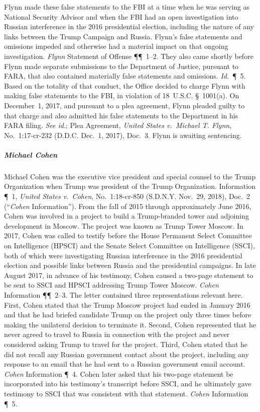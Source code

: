 Flynn made these false statements to the FBI at a time when he was serving as National Security Advisor and when the FBI had an open investigation into Russian interference in the 2016 presidential election, including the nature of any links between the Trump Campaign and Russia.
Flynn's false statements and omissions impeded and otherwise had a material impact on that ongoing investigation.
\textit{Flynn} Statement of Offense \P\P~1--2.
They also came shortly before Flynn made separate submissions to the Department of Justice, pursuant to FARA, that also contained materially false statements and omissions.
\textit{Id}.~\P~5.
Based on the totality of that conduct, the Office decided to charge Flynn with making false statements to the FBI, in violation of 18~U.S.C. \S~1001(a).
On December~1, 2017, and pursuant to a plea agreement, Flynn pleaded guilty to that charge and also admitted his false statements to the Department in his FARA filing.
\textit{See id}.; Plea Agreement, \textit{United States v.\ Michael T. Flynn}, No.~1:17-cr-232 (D.D.C. Dec.~1, 2017), Doc.~3.
Flynn is awaiting sentencing.

\subparagraph{Michael Cohen}
Michael Cohen was the executive vice president and special counsel to the Trump Organization when Trump was president of the Trump Organization.
Information \P~1, \textit{United States v.\ Cohen}, No.~1:18-cr-850 (S.D.N.Y. Nov.~29, 2018), Doc.~2 (``\textit{Cohen} Information'').
From the fall of 2015 through approximately June 2016, Cohen was involved in a project to build a Trump-branded tower and adjoining development in Moscow.
The project was known as Trump Tower Moscow.
In 2017, Cohen was called to testify before the House Permanent Select Committee on Intelligence (HPSCI) and the Senate Select Committee on Intelligence (SSCI), both of which were investigating Russian interference in the 2016 presidential election and possible links between Russia and the presidential campaigns.
In late August 2017, in advance of his testimony, Cohen caused a two-page statement to be sent to SSCI and HPSCI addressing Trump Tower Moscow.
\textit{Cohen} Information \P\P~2--3.
The letter contained three representations relevant here.
First, Cohen stated that the Trump Moscow project had ended in January 2016 and that he had briefed candidate Trump on the project only three times before making the unilateral decision to terminate it.
Second, Cohen represented that he never agreed to travel to Russia in connection with the project and never considered asking Trump to travel for the project.
Third, Cohen stated that he did not recall any Russian government contact about the project, including any response to an email that he had sent to a Russian government email account.
\textit{Cohen} Information \P~4.
Cohen later asked that his two-page statement be incorporated into his testimony's transcript before SSCI, and he ultimately gave testimony to SSCI that was consistent with that statement.
\textit{Cohen} Information \P~5.

